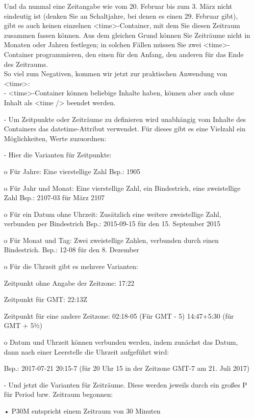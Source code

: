 Und da nunmal eine Zeitangabe wie vom 20. Februar bis zum 3. März nicht eindeutig ist (denken Sie an Schaltjahre, bei denen es einen 29. Februar gibt), gibt es auch keinen einzelnen <time>-Container, mit dem Sie diesen Zeitraum zusammen fassen können. Aus dem gleichen Grund können Sie Zeiträume nicht in Monaten oder Jahren festlegen; in solchen Fällen müssen Sie zwei <time>-Container programmieren, den einen für den Anfang, den anderen für das Ende des Zeitraums.\\

So viel zum Negativen, kommen wir jetzt zur praktischen Anwendung von <time>:\\

-	<time>-Container können beliebige Inhalte haben, können aber auch ohne Inhalt als <time /> beendet werden.

-	Um Zeitpunkte oder Zeiträume zu definieren wird unabhängig vom Inhalte des Containers das datetime-Attribut verwendet. Für dieses gibt es eine Vielzahl ein Möglichkeiten, Werte zuzuordnen:

-	Hier die Varianten für Zeitpunkte:

o	Für Jahre: Eine vierstellige Zahl
Bsp.: 1905

o	Für Jahr und Monat: Eine vierstellige Zahl, ein Bindestrich, eine zweistellige Zahl
Bsp.: 2107-03 für März 2107

o	Für ein Datum ohne Uhrzeit: Zusätzlich eine weitere zweistellige Zahl, verbunden per Bindestrich
Bsp.: 2015-09-15 für den 15. September 2015

o	Für Monat und Tag: Zwei zweistellige Zahlen, verbunden durch einen Bindestrich.
Bsp.: 12-08 für den 8. Dezember

o	Für die Uhrzeit gibt es mehrere Varianten:

	Zeitpunkt ohne Angabe der Zeitzone:
17:22

	Zeitpunkt für GMT:
22:13Z

	Zeitpunkt für eine andere Zeitzone:
02:18-05	(Für GMT - 5)
14:47+5:30	(für GMT + 5½)

o	Datum und Uhrzeit können verbunden werden, indem zunächst das Datum, dann nach einer Leerstelle die Uhrzeit aufgeführt wird:

Bsp.: 2017-07-21 20:15-7 (für 20 Uhr 15 in der Zeitzone GMT-7 am 21. Juli 2017)

-	Und jetzt die Varianten für Zeiträume. Diese werden jeweils durch ein großes P für Period bzw. Zeitraum begonnen:

•	P30M entspricht einem Zeitraum von 30 Minuten

